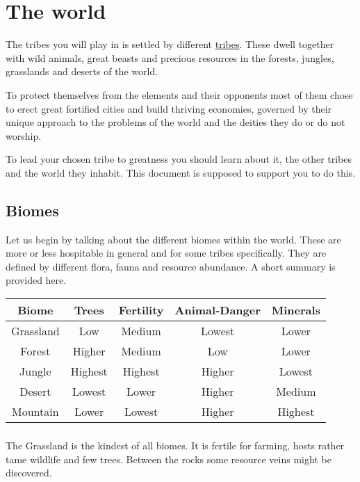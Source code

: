 \chapter{The world}\label{ch:World}

The tribes you will play in is settled by different
\hyperref[ch:Tribes]{tribes}. These dwell together with wild animals, great
beasts and precious resources in the forests, jungles, grasslands and deserts
of the world.

To protect themselves from the elements and their opponents most of them chose
to erect great fortified cities and build thriving economies, governed by their
unique approach to the problems of the world and the deities they do or do not
worship.

To lead your chosen tribe to greatness you should learn about it, the other
tribes and the world they inhabit. This document is supposed to support you to
do this.

\section{Biomes}\label{ch:World:Biomes}
Let us begin by talking about the different biomes within the world. These are
more or less hospitable in general and for some tribes specifically. They are
defined by different flora, fauna and resource abundance. A short summary is
provided here.

\begin{longtable}{cc ccc}
	\toprule
	Biome           & Trees   & Fertility & Animal-Danger & Minerals \\
	\midrule
	\Gls{Grassland} & Low     & Medium    & Lowest        & Lower    \\
	\Gls{Forest}    & Higher  & Medium    & Low           & Lower    \\
	\Gls{Jungle}    & Highest & Highest   & Higher        & Lowest   \\
	\Gls{Desert}    & Lowest  & Lower     & Higher        & Medium   \\
	\Gls{Mountain}  & Lower   & Lowest    & Higher        & Highest  \\
	\bottomrule
\end{longtable}

\subsection{}\label{ch:World:Biomes:Grassland}
The \Gls*{Grassland} is the kindest of all biomes. It is fertile for farming,
hosts rather tame wildlife and few trees. Between the rocks some resource veins
might be discovered.

